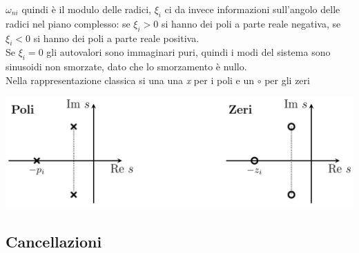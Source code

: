 \documentclass{article}
\numberwithin{equation}{subsection}
\let\oldsubsection\subsection%
\renewcommand{\subsection}{%
  \renewcommand{\theequation}{\thesubsection.\arabic{equation}}%
  \oldsubsection}%
\begin{document}
$\omega_{ni}$ quindi è il modulo delle radici, $\xi_i$ ci da invece informazioni sull'angolo delle radici nel piano complesso: se $\xi_i>0$ si hanno dei poli a parte reale negativa, se $\xi_i<0$ si hanno dei poli a parte reale positiva.\\
Se $\xi_i=0$ gli autovalori sono immaginari puri, quindi i modi del sistema sono sinusoidi non smorzate, dato che lo smorzamento è nullo.
\vspace*{0.2cm}\\
Nella rappresentazione classica si una una \textit{x} per i poli e un $\circ$ per gli zeri
\begin{center}
    \includegraphics[scale=0.23]{Images/Poli_rapp_classica.png}
\end{center}


\subsection{Cancellazioni}
\end{document}
